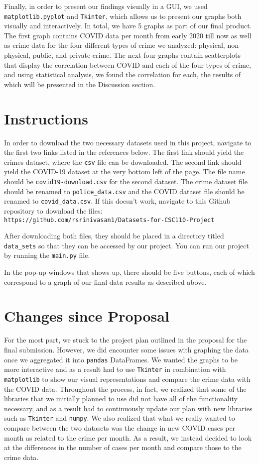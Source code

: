\documentclass[fontsize=11pt]{article}
\begin{document}
Finally, in order to present our findings visually in a GUI, we used \verb+matplotlib.pyplot+ and \verb+Tkinter+, which allows us to present our graphs both visually and interactively. In total, we have 5 graphs as part of our final product. The first graph contains COVID data per month from early 2020 till now as well as crime data for the four different types of crime we analyzed: physical, non-physical, public, and private crime. The next four graphs contain scatterplots that display the correlation between COVID and each of the four types of crime, and using statistical analysis, we found the correlation for each, the results of which will be presented in the Discussion section.

\section{Instructions}

In order to download the two necessary datasets used in this project, navigate to the first two links listed in the references below. The first link should yield the crimes dataset, where the \verb+csv+ file can be downloaded. The second link should yield the COVID-19 dataset at the very bottom left of the page. The file name should be \verb+covid19-download.csv+ for the second dataset. The crime dataset file should be renamed to \verb+police_data.csv+ and the COVID dataset file should be renamed to \verb+covid_data.csv+. If this doesn’t work, navigate to this Github repository to download the files:\\ \verb+https://github.com/rsrinivasan1/Datasets-for-CSC110-Project+

After downloading both files, they should be placed in a directory titled \verb+data_sets+ so that they can be accessed by our project. You can run our project by running the \verb+main.py+ file.

In the pop-up windows that shows up, there should be five buttons, each of which correspond to a graph of our final data results as described above.

\section{Changes since Proposal}
For the most part, we stuck to the project plan outlined in the proposal for the final submission. However, we did encounter some issues with graphing the data once we aggregated it into \verb+pandas+ DataFrames. We wanted the graphs to be more interactive and as a result had to use \verb+Tkinter+ in combination with \verb+matplotlib+ to show our visual representations and compare the crime data with the COVID data. Throughout the process, in fact, we realized that some of the libraries that we initially planned to use did not have all of the functionality necessary, and as a result had to continuously update our plan with new libraries such as \verb+Tkinter+ and \verb+numpy+. We also realized that what we really wanted to compare between the two datasets was the change in new COVID cases per month as related to the crime per month. As a result, we instead decided to look at the differences in the number of cases per month and compare those to the crime data.
\end{document}
